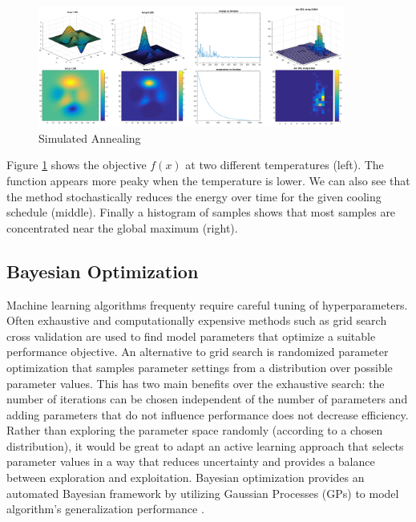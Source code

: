 \begin{figure}[tbhp]
    \centering
    \includegraphics[width=0.9\textwidth, trim={10 10 10 10}]{figures/sim_annealing_merged.png}
    \caption{Simulated Annealing}
    \label{fig:sim_annealing_merged}
\end{figure}

Figure \ref{fig:sim_annealing_merged} shows the objective $f(x)$ at two different temperatures (left). The function appears more peaky when the temperature is lower. We can also see that the method stochastically reduces the energy over time for the given cooling schedule (middle). Finally a histogram of samples shows that most samples are concentrated near the global maximum (right).


\subsection{Bayesian Optimization}

Machine learning algorithms frequenty require careful tuning of hyperparameters. Often exhaustive and computationally expensive methods such as grid search cross validation are used to find model parameters that optimize a suitable performance objective. An alternative to grid search is randomized parameter optimization that samples parameter settings from a distribution over possible parameter values. This has two main benefits over the exhaustive search: the number of iterations can be chosen independent of the number of parameters and adding parameters that do not influence performance does not decrease efficiency. Rather than exploring the parameter space randomly (according to a chosen distribution), it would be great to adapt an active learning approach that selects parameter values in a way that reduces uncertainty and provides a balance between exploration and exploitation. Bayesian optimization provides an automated Bayesian framework by utilizing Gaussian Processes (GPs) to model algorithm's generalization performance \cite{snoek2012}.\\

